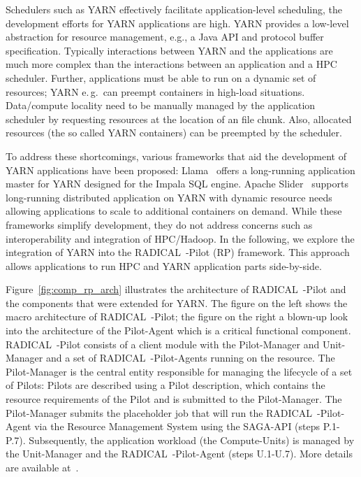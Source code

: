 Schedulers such as YARN effectively facilitate application-level scheduling, the development efforts for YARN applications are high. YARN provides a low-level abstraction for resource management, e.g., a Java API and protocol buffer specification.
Typically interactions between YARN and the applications are much more complex than the interactions between an application and a HPC scheduler.
Further, applications must be able to run on a dynamic set of resources; YARN e.\,g.\ can preempt containers in high-load situations.
Data/compute locality need to be manually managed by the application scheduler by requesting resources at the location of an file chunk.
Also, allocated resources (the so called YARN containers) can be preempted by the scheduler.

To address these shortcomings, various frameworks that aid the development of YARN applications have been proposed: Llama~\cite{llama} offers a long-running application master for YARN designed for the Impala SQL engine.
Apache Slider~\cite{apache-slider} supports long-running distributed application on YARN with dynamic resource needs allowing applications to scale to additional containers on demand.
While these frameworks simplify development, they do not address concerns such as interoperability and integration of HPC/Hadoop.
In the following, we explore the integration of YARN into the RADICAL~-Pilot (RP) framework.
This approach allows applications to run HPC and YARN application parts side-by-side.

Figure~\ref{fig:comp_rp_arch} illustrates the architecture of RADICAL~-Pilot and the components that were extended for YARN.
The figure on the left shows the macro architecture of RADICAL~-Pilot; the figure on the right a blown-up look into the architecture of the Pilot-Agent which is a critical functional component.
RADICAL~-Pilot consists of a client module with the Pilot-Manager and Unit-Manager and a set of RADICAL~-Pilot-Agents running on the resource.
The Pilot-Manager is the central entity responsible for managing the lifecycle of a set of Pilots: Pilots are described using a Pilot description, which contains the resource requirements of the Pilot and is submitted to the Pilot-Manager.
The Pilot-Manager submits the placeholder job that will run the RADICAL~-Pilot-Agent via the Resource Management System using the SAGA-API (steps P.1-P.7).
Subsequently, the application workload (the Compute-Units) is managed by the Unit-Manager and the RADICAL~-Pilot-Agent (steps U.1-U.7).
More details are available at~\cite{merzky2019using}.

